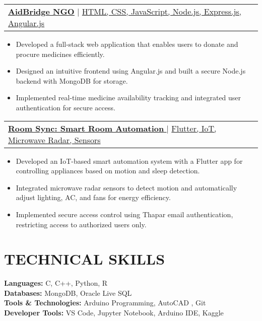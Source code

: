 \documentclass[letterpaper,11pt]{article}
\makeatletter
\newcommand{\resumeItem}[1]{
  \item\small{
    {#1 \vspace{-2pt}}
  }
}
\newcommand{\resumeProjectHeading}[2]{
    \item
    \begin{tabular*}{1.001\textwidth}{l@{\extracolsep{\fill}}r}
      \small#1 & \textbf{\small #2}\\
    \end{tabular*}\vspace{-7pt}
}
\newcommand{\resumeItemListStart}{\begin{itemize}}
\newcommand{\resumeItemListEnd}{\end{itemize}\vspace{-5pt}}
\makeatother
\begin{document}
\resumeProjectHeading
  {\href{https://github.com/k-vanshhh/Aid-Bridge-NGO}{\textbf{\large{\underline{AidBridge NGO}}}} 
  \href{https://aid-bridge.vercel.app/}{\raisebox{-0.1\height}{\faGlobe}} 
  $|$ \large{\underline{HTML, CSS, JavaScript, Node.js, Express.js, Angular.js}}}{}
      \resumeItemListStart
        \resumeItem{\normalsize{Developed a full-stack web application that enables users to donate and procure medicines efficiently.}}\\
        \resumeItem{\normalsize{Designed an intuitive frontend using Angular.js and built a secure Node.js backend with MongoDB for storage.}}\\
        \resumeItem{\normalsize{Implemented real-time medicine availability tracking and integrated user authentication for secure access.}}
      \resumeItemListEnd
      \vspace{-16pt}
       \resumeProjectHeading
      {\href{https://github.com/k-vanshhh/RoomSync_esp}{\textbf{\large{\underline{Room Sync: Smart Room Automation}}} \raisebox{-0.1\height}} $|$ \large{\underline{Flutter, IoT, Microwave Radar, Sensors}}}{}
      \resumeItemListStart
        \resumeItem{\normalsize{Developed an IoT-based smart automation system with a Flutter app for controlling appliances based on motion and sleep detection.}}\\
        \resumeItem{\normalsize{Integrated microwave radar sensors to detect motion and automatically adjust lighting, AC, and fans for energy efficiency.}}
        \resumeItem{\normalsize{Implemented secure access control using Thapar email authentication, restricting access to authorized users only.}}
      \resumeItemListEnd
      \vspace{-10pt}
  

\section{TECHNICAL SKILLS}
\begin{itemize}[leftmargin=0.15in, label={}]
    \small{\item{
        \textbf{\normalsize{Languages:}}{ \normalsize{C, C++, Python, R}} \\
        \vspace{2pt}
        \textbf{\normalsize{Databases:}}{ \normalsize{MongoDB, Oracle Live SQL}} \\
        \vspace{2pt}
        \textbf{\normalsize{Tools \& Technologies:}}{ \normalsize{Arduino Programming, AutoCAD , Git }} \\
        \vspace{2pt}
        \textbf{\normalsize{Developer Tools:}}{ \normalsize{VS Code, Jupyter Notebook, Arduino IDE, Kaggle}} \\
    }}
\end{itemize}
\vspace{-10pt}
\end{document}
